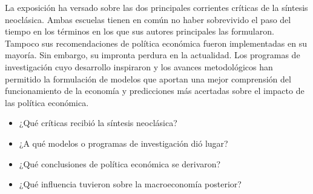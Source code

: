 \documentclass{nuevotema}
\begin{document}
La exposición ha versado sobre las dos principales corrientes críticas de la síntesis neoclásica. Ambas escuelas tienen en común no haber sobrevivido el paso del tiempo en los términos en los que sus autores principales las formularon. Tampoco sus recomendaciones de política económica fueron implementadas en su mayoría. Sin embargo, su impronta perdura en la actualidad. Los programas de investigación cuyo desarrollo inspiraron y los avances metodológicos han permitido la formulación de modelos que aportan una mejor comprensión del funcionamiento de la economía y predicciones más acertadas sobre el impacto de las política económica.


\begin{itemize}
	\item ¿Qué críticas recibió la síntesis neoclásica?
	\item ¿A qué modelos o programas de investigación dió lugar?
	\item ¿Qué conclusiones de política económica se derivaron?
	\item ¿Qué influencia tuvieron sobre la macroeconomía posterior?
\end{itemize}

\esquemacorto
\end{document}
